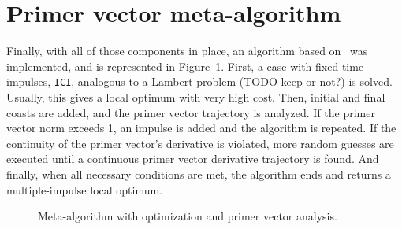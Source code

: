 


\section{Primer vector meta-algorithm}\label{sec:impulsive_statement}

Finally, with all of those components in place, an algorithm based on~ was implemented, and is represented in Figure~\ref{fig:meta_alg}. First, a case with fixed time impulses, \texttt{ICI}, analogous to a Lambert problem (TODO keep or not?) is solved. Usually, this gives a local optimum with very high cost. Then, initial and final coasts are added, and the primer vector trajectory is analyzed. If the primer vector norm exceeds 1, an impulse is added and the algorithm is repeated. If the continuity of the primer vector's derivative is violated, more random guesses are executed until a continuous primer vector derivative trajectory is found. And finally, when all necessary conditions are met, the algorithm ends and returns a multiple-impulse local optimum.

\begin{figure}[htbp]
    \centering
    \caption{Meta-algorithm with optimization and primer vector analysis.}
    \label{fig:meta_alg}
\end{figure}

